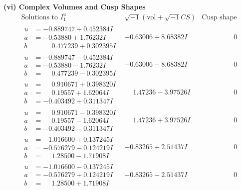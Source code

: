 \documentclass[1p]{elsarticle_modified}
\theoremstyle{definition}
\newcommand{\I}{\sqrt{-1}}
\begin{document}
\newpage\flushleft \textbf{(vi) Complex Volumes and Cusp Shapes}
$$\begin{array}{c|c|c}  
\text{Solutions to }I^u_{1}& \I (\text{vol} + \sqrt{-1}CS) & \text{Cusp shape}\\
 \hline 
\begin{aligned}
u &= -0.889747 + 0.452384 I \\
a &= -0.53880 + 1.76232 I \\
b &= \phantom{-}0.477239 + 0.302395 I\end{aligned}
 & -0.63006 + 8.68382 I & \phantom{-0.000000 } 0 \\ \hline\begin{aligned}
u &= -0.889747 - 0.452384 I \\
a &= -0.53880 - 1.76232 I \\
b &= \phantom{-}0.477239 - 0.302395 I\end{aligned}
 & -0.63006 - 8.68382 I & \phantom{-0.000000 } 0 \\ \hline\begin{aligned}
u &= \phantom{-}0.910671 + 0.398320 I \\
a &= \phantom{-}0.19557 + 1.62064 I \\
b &= -0.403492 + 0.311347 I\end{aligned}
 & \phantom{-}1.47236 - 3.97526 I & \phantom{-0.000000 } 0 \\ \hline\begin{aligned}
u &= \phantom{-}0.910671 - 0.398320 I \\
a &= \phantom{-}0.19557 - 1.62064 I \\
b &= -0.403492 - 0.311347 I\end{aligned}
 & \phantom{-}1.47236 + 3.97526 I & \phantom{-0.000000 } 0 \\ \hline\begin{aligned}
u &= -1.016600 + 0.137245 I \\
a &= -0.576279 - 0.124219 I \\
b &= \phantom{-}1.28500 - 1.71908 I\end{aligned}
 & -0.83265 + 2.51437 I & \phantom{-0.000000 } 0 \\ \hline\begin{aligned}
u &= -1.016600 - 0.137245 I \\
a &= -0.576279 + 0.124219 I \\
b &= \phantom{-}1.28500 + 1.71908 I\end{aligned}
 & -0.83265 - 2.51437 I & \phantom{-0.000000 } 0 \\ \hline\begin{aligned}

\end{aligned}
\end{array}$$
\end{document}
